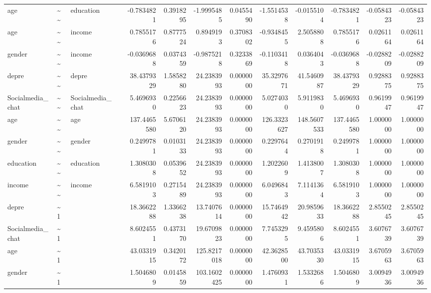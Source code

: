 \documentclass[
]{article}
\begin{document}
\begin{table}[!h]
\begin{tabular}[t]{llllrrrrrrrrr}
age & \textasciitilde{}\textasciitilde{} & education &  & -0.7834821 & 0.3918295 & -1.9995485 & 0.0455490 & -1.5514538 & -0.0155104 & -0.7834821 & -0.0584323 & -0.0584323\\
age & \textasciitilde{}\textasciitilde{} & income &  & 0.7855176 & 0.8777524 & 0.8949193 & 0.3708302 & -0.9348455 & 2.5058808 & 0.7855176 & 0.0261164 & 0.0261164\\
gender & \textasciitilde{}\textasciitilde{} & income &  & -0.0369688 & 0.0374359 & -0.9875218 & 0.3233869 & -0.1103418 & 0.0364043 & -0.0369688 & -0.0288209 & -0.0288209\\
\addlinespace
depre & \textasciitilde{}\textasciitilde{} & depre &  & 38.4379329 & 1.5858280 & 24.2383993 & 0.0000000 & 35.3297671 & 41.5460987 & 38.4379329 & 0.9288375 & 0.9288375\\
Socialmedia\_chat & \textasciitilde{}\textasciitilde{} & Socialmedia\_chat &  & 5.4696930 & 0.2256623 & 24.2383993 & 0.0000000 & 5.0274030 & 5.9119830 & 5.4696930 & 0.9619947 & 0.9619947\\
age & \textasciitilde{}\textasciitilde{} & age &  & 137.4465580 & 5.6706120 & 24.2383993 & 0.0000000 & 126.3323627 & 148.5607533 & 137.4465580 & 1.0000000 & 1.0000000\\
gender & \textasciitilde{}\textasciitilde{} & gender &  & 0.2499781 & 0.0103133 & 24.2383993 & 0.0000000 & 0.2297644 & 0.2701918 & 0.2499781 & 1.0000000 & 1.0000000\\
education & \textasciitilde{}\textasciitilde{} & education &  & 1.3080308 & 0.0539652 & 24.2383993 & 0.0000000 & 1.2022609 & 1.4138007 & 1.3080308 & 1.0000000 & 1.0000000\\
\addlinespace
income & \textasciitilde{}\textasciitilde{} & income &  & 6.5819103 & 0.2715489 & 24.2383993 & 0.0000000 & 6.0496843 & 7.1141364 & 6.5819103 & 1.0000000 & 1.0000000\\
depre & \textasciitilde{}1 &  &  & 18.3662288 & 1.3366238 & 13.7407614 & 0.0000000 & 15.7464942 & 20.9859633 & 18.3662288 & 2.8550245 & 2.8550245\\
Socialmedia\_chat & \textasciitilde{}1 &  &  & 8.6024551 & 0.4373170 & 19.6709823 & 0.0000000 & 7.7453295 & 9.4595806 & 8.6024551 & 3.6076739 & 3.6076739\\
age & \textasciitilde{}1 &  &  & 43.0331915 & 0.3420172 & 125.8217018 & 0.0000000 & 42.3628500 & 43.7035330 & 43.0331915 & 3.6705963 & 3.6705963\\
gender & \textasciitilde{}1 &  &  & 1.5046809 & 0.0145859 & 103.1602425 & 0.0000000 & 1.4760931 & 1.5332686 & 1.5046809 & 3.0094936 & 3.0094936\\

\end{tabular}
\end{table}
\end{document}
